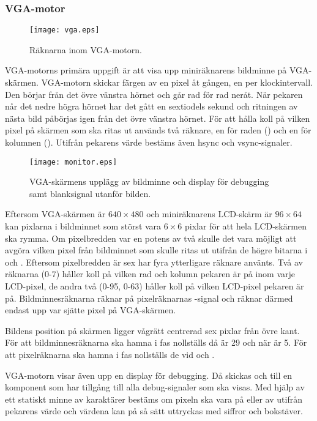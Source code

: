 \documentclass[main.tex]{subfiles}
\begin{document}
\subsubsection{VGA-motor}
\begin{SCfigure}
    \centering
    \texttt{[image: vga.eps]}
    \label{fig:vga}
    \caption{Räknarna inom VGA-motorn.}
\end{SCfigure}
VGA-motorns primära uppgift är att visa upp miniräknarens bildminne på
VGA-skärmen. VGA-motorn skickar färgen av en pixel åt gången, en per
klockintervall. Den börjar från det övre vänstra hörnet och går rad för rad
neråt. När pekaren når det nedre högra hörnet har det gått en sextiodels sekund
och ritningen av nästa bild påbörjas igen från det övre vänstra hörnet. För att
hålla koll på vilken pixel på skärmen som ska ritas ut används två räknare, en
för raden () och en för kolumnen (). Utifrån
pekarens värde bestäms även hsync och vsync-signaler.

\begin{wrapfigure}{r}{0.4\textwidth}
    \vspace*{-5mm}
    \texttt{[image: monitor.eps]}
    \label{fig:monitor}
    \caption{VGA-skärmens upplägg av bildminne och display för debugging samt
    blanksignal utanför bilden.}
\end{wrapfigure}
Eftersom VGA-skärmen är $640\times480$ och miniräknarens LCD-skärm är
$96\times64$ kan pixlarna i bildminnet som störst vara $6\times6$ pixlar för
att hela LCD-skärmen ska rymma. Om pixelbredden var en potens av två skulle det
vara möjligt att avgöra vilken pixel från bildminnet som skulle ritas ut
utifrån de högre bitarna i  och . Eftersom
pixelbredden är sex har fyra ytterligare räknare använts. Två av räknarna (0-7)
håller koll på vilken rad och kolumn pekaren är på inom varje LCD-pixel, de
andra två (0-95, 0-63) håller koll på vilken LCD-pixel pekaren är på.
Bildminnesräknarna räknar på pixelräknarnas -signal och räknar därmed
endast upp var sjätte pixel på VGA-skärmen.

Bildens position på skärmen ligger vågrätt centrerad sex pixlar från övre kant.
För att bildminnesräknarna ska hamna i fas nollställs  då
 är 29 och  när  är 5. För att
pixelräknarna ska hamna i fas nollställs de vid  och
.

VGA-motorn visar även upp en display för debugging. Då skickas 
och  till en komponent som har tillgång till alla debug-signaler
som ska visas. Med hjälp av ett statiskt minne av karaktärer bestäms om pixeln
ska vara på eller av utifrån pekarens värde och värdena kan på så sätt
uttryckas med siffror och bokstäver.
\end{document}
